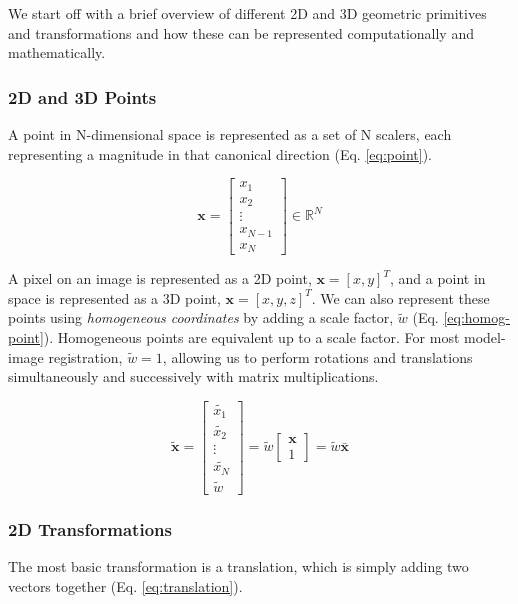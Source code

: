 We start off with a brief overview of different 2D and 3D geometric primitives and transformations and how these can be represented computationally and mathematically.

\subsubsection{2D and 3D Points}
A point in N-dimensional space is represented as a set of N scalers, each representing a magnitude in that canonical direction (Eq. \ref{eq:point}).

\begin{equation}
    \mathbf{x} = \begin{bmatrix}
        x_1 \\ x_2 \\ \vdots \\ x_{N-1} \\ x_N
    \end{bmatrix} \in \mathbb{R}^N
    \label{eq:point}
\end{equation}

A pixel on an image is represented as a 2D point, $\mathbf{x} = [x , y]^{T}$, and a point in space is represented as a 3D point, $\mathbf{x} = [x , y , z]^{T}$. We can also represent these points using \emph{homogeneous coordinates} by adding a scale factor, $\tilde{w}$ (Eq. \ref{eq:homog-point}). Homogeneous points are equivalent up to a scale factor. For most model-image registration, $\tilde{w} = 1$, allowing us to perform rotations and translations simultaneously and successively with matrix multiplications.

\begin{equation}
    \tilde{\mathbf{x}} = \begin{bmatrix}
        \tilde{x_1} \\ \tilde{x_2} \\ \vdots \\ \tilde{x_N} \\ \tilde{w}
    \end{bmatrix} = \tilde{w}\begin{bmatrix}
        \mathbf{x}\\ 1
    \end{bmatrix} = \tilde{w}\bar{\mathbf{x}}
    \label{eq:homog-point}
\end{equation}

\subsubsection{2D Transformations}
The most basic transformation is a translation, which is simply adding two vectors together (Eq. \ref{eq:translation}).


